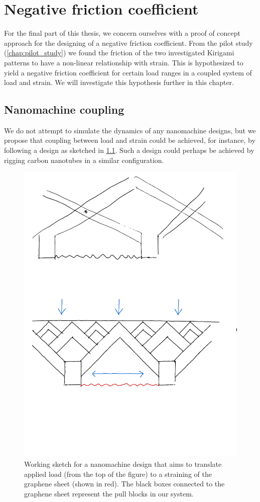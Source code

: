 \chapter{Negative friction coefficient}\label{chap:negative_coef}
For the final part of this thesis, we concern ourselves with a proof of concept approach for the designing of a negative friction coefficient. From the pilot study (\cref{chap:pilot_study}) we found the friction of the two investigated Kirigami patterns to have a non-linear relationship with strain. This is hypothesized to yield a negative friction coefficient for certain load ranges in a coupled system of load and strain. We will investigate this hypothesis further in this chapter.

\section{Nanomachine coupling}
We do not attempt to simulate the dynamics of any nanomachine designs, but we propose that coupling between load and strain could be achieved, for instance, by following a design as sketched in \cref{fig:nanomachine}. Such a design could perhaps be achieved by rigging carbon nanotubes in a similar configuration. 

\begin{figure}[H]
  \centering
  \includegraphics[width=0.5\linewidth]{figures/negative_coefficient/nanomachine.pdf}
  \caption{Working sketch for a nanomachine design that aims to translate applied load (from the top of the figure) to a straining of the graphene sheet (shown in red). The black boxes connected to the graphene sheet represent the pull blocks in our system.}
  \label{fig:nanomachine}
\end{figure}

